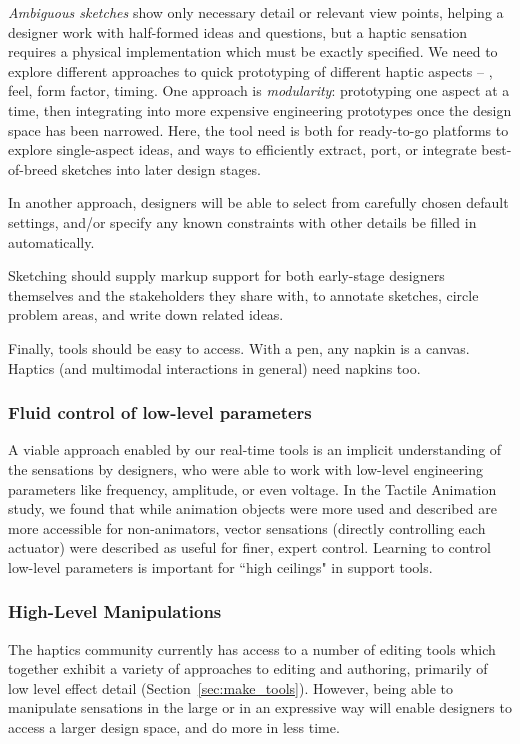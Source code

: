 \textit{Ambiguous sketches} show only necessary detail or relevant view points, helping a designer work with half-formed ideas and questions, but a haptic sensation requires a physical implementation which must be exactly specified. 
%
We need to explore different approaches to quick prototyping of different haptic aspects -- \eg, feel, form factor, timing. One approach is \textit{modularity}: prototyping one aspect at a time, then integrating into more expensive engineering prototypes once the design space has been narrowed. Here, the tool need is both for ready-to-go platforms to explore single-aspect ideas, and ways to efficiently extract, port, or integrate best-of-breed sketches into later design stages.
    
 In another approach, designers will be able to select from carefully chosen default settings, and/or specify  any known constraints with other details be filled in automatically. 
    
 Sketching should supply markup support for both early-stage designers themselves and the stakeholders they share with, to  annotate sketches, circle problem areas, and write down related ideas.
    
 Finally, tools should be easy to access. With a pen, any napkin is a canvas. Haptics (and multimodal interactions in general) need napkins too. 


%
%
\subsubsection{Fluid control of low-level parameters}
A viable approach enabled by our real-time tools is an implicit understanding of the sensations by designers, who were able to work with low-level engineering parameters like frequency, amplitude, or even voltage.
In the Tactile Animation study, we found that while animation objects were more used and described are more accessible for non-animators, vector sensations (directly controlling each actuator) were described as useful for finer, expert control.
Learning to control low-level parameters is important for ``high ceilings" in \haxd support tools.



%
%
\subsubsection{High-Level Manipulations} 
The haptics community currently has access to a number of editing tools which together exhibit a variety of approaches to editing and authoring, primarily of low level effect detail (Section~\ref{sec:make_tools}).
However, being able to manipulate sensations in the large or in an expressive way will enable designers to access a larger design space, and do more in less time.

